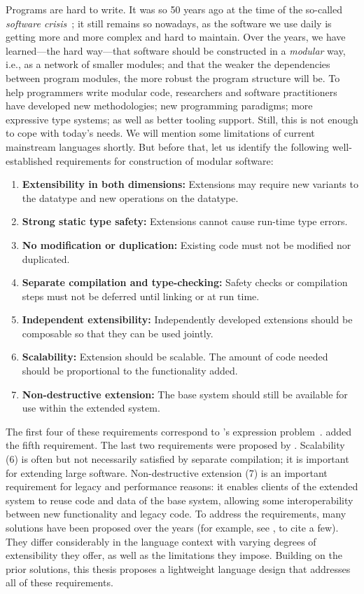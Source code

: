 Programs are hard to write. It was so 50 years ago at the time of the so-called
\textit{software crisis}~\citep{Naur:1969:SER:1102020}; it still remains so
nowadays, as the software we use daily is getting more and more complex and hard
to maintain. Over the years, we have learned---the hard way---that software
should be constructed in a \textit{modular} way, i.e., as a network of smaller
modules; and that the weaker the dependencies between program modules, the more
robust the program structure will be. To help programmers write modular code,
researchers and software practitioners have developed new methodologies; new
programming paradigms; more expressive type systems; as well as better tooling
support. Still, this is not enough to cope with today's needs. We will mention
some limitations of current mainstream languages shortly. But before that, let
us identify the following well-established requirements for construction of
modular software:
\begin{enumerate}
\item \textbf{Extensibility in both dimensions:} Extensions may require new
  variants to the datatype and new operations on the datatype.
\item \textbf{Strong static type safety:} Extensions cannot cause run-time type errors.
\item \textbf{No modification or duplication:} Existing code must not be
  modified nor duplicated.
\item \textbf{Separate compilation and type-checking:} Safety checks or
  compilation steps must not be deferred until linking or at run time.
\item \textbf{Independent extensibility:} Independently developed extensions
  should be composable so that they can be used jointly.
\item \textbf{Scalability:} Extension should be scalable. The amount of code
  needed should be proportional to the functionality added.
\item \textbf{Non-destructive extension:} The base system should still be
  available for use within the extended system.
\end{enumerate}
The first four of these requirements correspond to
\citeauthor{wadler1998expression}'s expression
problem~\citep{wadler1998expression}. \citet{Zenger-Odersky2005} added the fifth
requirement. The last two requirements were proposed by \citet{Nystrom:2006}.
Scalability (6) is often but not necessarily satisfied by separate compilation;
it is important for extending large software. Non-destructive extension (7) is
an important requirement for legacy and performance reasons: it enables clients
of the extended system to reuse code and data of the base system, allowing some
interoperability between new functionality and legacy code. To address the
requirements, many solutions have been proposed over the years (for example, see
\citet{oliveira2012extensibility, wang2016expression, oliveira09modular,
  swierstra_2008, Zenger-Odersky2005}, to cite a few). They differ considerably
in the language context with varying degrees of extensibility they offer, as
well as the limitations they impose. Building on the prior solutions, this
thesis proposes a lightweight language design that addresses all of these
requirements.

